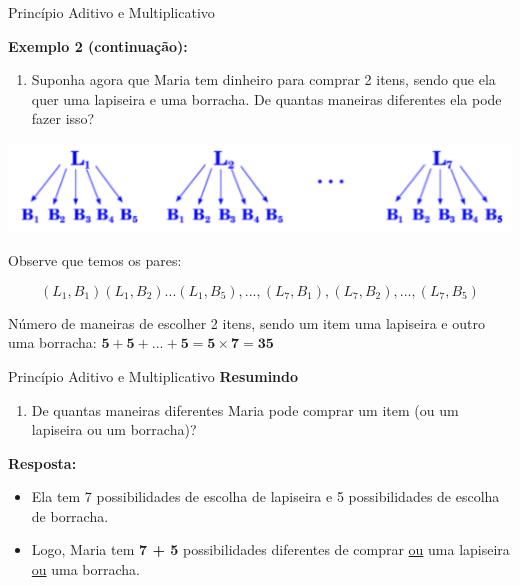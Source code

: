 \documentclass[aspectratio=169]{beamer}
\begin{document}
\begin{frame}{Princípio Aditivo e Multiplicativo}

    \textbf{Exemplo  2 (continuação):}

    \vspace{3mm}
    \begin{enumerate}[b]
        \item Suponha agora que Maria tem dinheiro para comprar 2 itens, sendo que ela quer uma lapiseira e uma borracha. De quantas maneiras diferentes ela pode fazer isso?
    \end{enumerate}

    \begin{center}
        \includegraphics[width=0.8\linewidth]{figs/combinacoes_maria.png}
    \end{center}

    \vspace{2mm}

    Observe que temos os pares:

    \vspace{2mm}

    $$(L_1, B_1) (L_1, B_2) ... (L_1, B_5), ... , (L_7, B_1), (L_7, B_2), ... , (L_7, B_5)$$

    \vspace{2mm}
Número de maneiras de escolher 2 itens, sendo um item uma lapiseira e outro uma borracha: $\boldsymbol{5 + 5 + ... + 5 = 5 \times 7 = 35}$
\end{frame}


\begin{frame}{Princípio Aditivo e Multiplicativo}
\textbf{Resumindo}

\begin{enumerate}[a]
    \item De quantas maneiras diferentes Maria pode comprar um item (ou um lapiseira ou um borracha)?
\end{enumerate}

\vspace{4mm}
\textbf{Resposta:}

\begin{itemize}
    \item[] Ela tem 7 possibilidades de escolha de lapiseira e 5 possibilidades de escolha de borracha.
    \item[] Logo, Maria tem \textbf{7 + 5} possibilidades diferentes de comprar \underline{ou} uma lapiseira \underline{ou} uma borracha. 
\end{itemize}

\end{frame}
\end{document}
